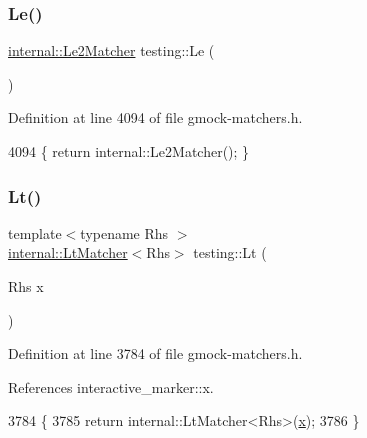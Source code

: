 \subsubsection{\texorpdfstring{Le()}{Le()}\hspace{0.1cm}{\footnotesize\ttfamily [2/2]}}
{\footnotesize\ttfamily \hyperlink{classtesting_1_1internal_1_1Le2Matcher}{internal\+::\+Le2\+Matcher} testing\+::\+Le (\begin{DoxyParamCaption}{ }\end{DoxyParamCaption})\hspace{0.3cm}{\ttfamily [inline]}}



Definition at line 4094 of file gmock-\/matchers.\+h.


\begin{DoxyCode}
4094 \{ \textcolor{keywordflow}{return} internal::Le2Matcher(); \}
\end{DoxyCode}
\mbox{\label{namespacetesting_ad621459957a8bcdd3c256b7940ecbf99}} 
\subsubsection{\texorpdfstring{Lt()}{Lt()}\hspace{0.1cm}{\footnotesize\ttfamily [1/2]}}
{\footnotesize\ttfamily template$<$typename Rhs $>$ \\
\hyperlink{classtesting_1_1internal_1_1LtMatcher}{internal\+::\+Lt\+Matcher}$<$Rhs$>$ testing\+::\+Lt (\begin{DoxyParamCaption}\item[{Rhs}]{x }\end{DoxyParamCaption})\hspace{0.3cm}{\ttfamily [inline]}}



Definition at line 3784 of file gmock-\/matchers.\+h.



References interactive\+\_\+marker\+::x.


\begin{DoxyCode}
3784                                         \{
3785   \textcolor{keywordflow}{return} internal::LtMatcher<Rhs>(\hyperlink{namespaceinteractive__marker_acda52804aef30b460a72fb21ee01d69d}{x});
3786 \}
\end{DoxyCode}
\mbox{\label{namespacetesting_a3b4d6d29d715c1bf219163f5206b53d4}} 
